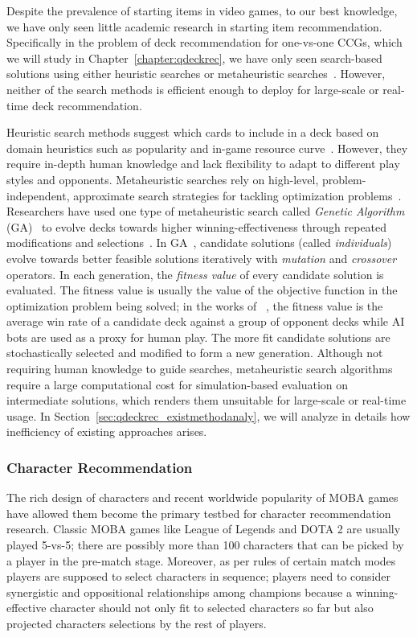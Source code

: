 Despite the prevalence of starting items in video games, to our best knowledge, we have only seen little academic research in starting item recommendation. Specifically in the problem of deck recommendation for one-vs-one CCGs, which we will study in Chapter~\ref{chapter:qdeckrec}, we have only seen search-based solutions using either heuristic searches or metaheuristic searches~\cite{birattari2009tuning}. However, neither of the search methods is efficient enough to deploy for large-scale or real-time deck recommendation. 

Heuristic search methods suggest which cards to include in a deck based on domain heuristics such as popularity and in-game resource curve~\cite{frankkarsten,willfancher,stiegler2016hearthstone}. However, they require in-depth human knowledge and lack flexibility to adapt to different play styles and opponents. Metaheuristic searches rely on high-level, problem-independent, approximate search strategies for tackling optimization problems~\cite{birattari2009tuning}. Researchers have used one type of metaheuristic search called \textit{Genetic Algorithm} (GA)~\cite{holland1992adaptation} to evolve decks towards higher winning-effectiveness through repeated modifications and selections~\cite{garcia2016evolutionary,bjorke2017deckbuilding}. In GA~\cite{holland1992adaptation}, candidate solutions (called \textit{individuals}) evolve towards better feasible solutions iteratively with \textit{mutation} and \textit{crossover} operators. In each generation, the \textit{fitness value} of every candidate solution is evaluated. The fitness value is usually the value of the objective function in the optimization problem being solved; in the works of ~\cite{garcia2016evolutionary,bjorke2017deckbuilding}, the fitness value is the average win rate of a candidate deck against a group of opponent decks while AI bots are used as a proxy for human play. The more fit candidate solutions are stochastically selected and modified to form a new generation. Although not requiring human knowledge to guide searches, metaheuristic search algorithms require a large computational cost for simulation-based evaluation on intermediate solutions, which renders them unsuitable for large-scale or real-time usage. In Section~\ref{sec:qdeckrec_existmethodanaly}, we will analyze in details how inefficiency of existing approaches arises. 

\subsubsection{Character Recommendation}
The rich design of characters and recent worldwide popularity of MOBA games have allowed them become the primary testbed for character recommendation research. Classic MOBA games like League of Legends and DOTA 2 are usually played 5-vs-5; there are possibly more than 100 characters that can be picked by a player in the pre-match stage. Moreover, as per rules of certain match modes players are supposed to select characters in sequence; players need to consider synergistic and oppositional relationships among champions because a winning-effective character should not only fit to selected characters so far but also projected characters selections by the rest of players. 

